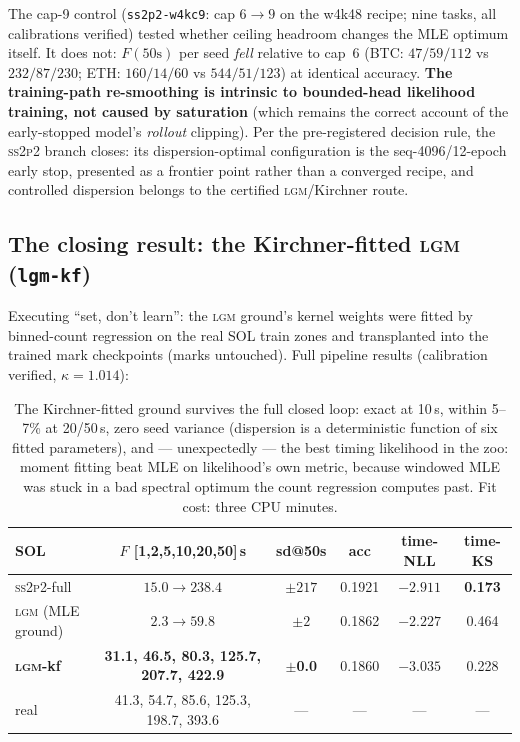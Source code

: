 \documentclass[11pt]{article}
\newcommand{\sspp}{\textsc{ss2p2}}
\newcommand{\lgm}{\textsc{lgm}}
\newcommand{\Fano}{F}
\begin{document}
The cap-9 control (\texttt{ss2p2-w4kc9}: cap $6\!\to\!9$ on the w4k48 recipe; nine
tasks, all calibrations verified) tested whether ceiling headroom changes the MLE
optimum itself. It does not: $\Fano(50\text{s})$ per seed \emph{fell} relative to
cap~6 (BTC: $47/59/112$ vs $232/87/230$; ETH: $160/14/60$ vs $544/51/123$) at
identical accuracy. \textbf{The training-path re-smoothing is intrinsic to
bounded-head likelihood training, not caused by saturation} (which remains the
correct account of the early-stopped model's \emph{rollout} clipping). Per the
pre-registered decision rule, the \sspp{} branch closes: its dispersion-optimal
configuration is the seq-4096/12-epoch early stop, presented as a frontier point
rather than a converged recipe, and controlled dispersion belongs to the certified
\lgm{}/Kirchner route.

\subsection{The closing result: the Kirchner-fitted \lgm{} (\texttt{lgm-kf})}

Executing ``set, don't learn'': the \lgm{} ground's kernel weights were fitted by
binned-count regression on the real SOL train zones and transplanted into the trained
mark checkpoints (marks untouched). Full pipeline results (calibration verified,
$\kappa=1.014$):

\begin{table}[h]\centering\small
\begin{tabular}{lccccc}
\toprule
SOL & $\Fano$ [1,2,5,10,20,50]\,s & sd@50s & acc & time-NLL & time-KS \\
\midrule
\sspp{}-full & $15.0 \to 238.4$ & $\pm 217$ & 0.1921 & $-2.911$ & \textbf{0.173} \\
\lgm{} (MLE ground) & $2.3 \to 59.8$ & $\pm 2$ & 0.1862 & $-2.227$ & 0.464 \\
\textbf{\lgm{}-kf} & \textbf{31.1, 46.5, 80.3, 125.7, 207.7, 422.9} & $\pm$\textbf{0.0} & 0.1860 & $\mathbf{-3.035}$ & 0.228 \\
real & 41.3, 54.7, 85.6, 125.3, 198.7, 393.6 & --- & --- & --- & --- \\
\bottomrule
\end{tabular}
\caption{The Kirchner-fitted ground survives the full closed loop: exact at 10\,s,
within 5--7\% at 20/50\,s, zero seed variance (dispersion is a deterministic function
of six fitted parameters), and --- unexpectedly --- the best timing likelihood in the
zoo: moment fitting beat MLE on likelihood's own metric, because windowed MLE was
stuck in a bad spectral optimum the count regression computes past. Fit cost: three
CPU minutes.}
\label{tab:kf}
\end{table}
\end{document}
